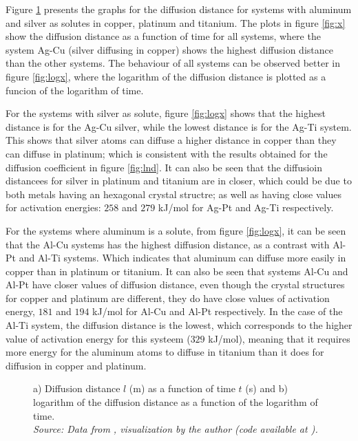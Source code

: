 Figure \ref{fig:length} presents the graphs for the diffusion distance for systems with aluminum and silver as solutes in copper, platinum and titanium. The plots in figure \ref{fig:x} show the diffusion distance as a function of time for all systems, where the system Ag-Cu (silver diffusing in copper) shows the highest diffusion distance than the other systems. The behaviour of all systems can be observed better in figure \ref{fig:logx}, where the logarithm of the diffusion distance is plotted as a funcion of the logarithm of time.

For the systems with silver as solute, figure \ref{fig:logx} shows that the highest distance is for the Ag-Cu silver, while the lowest distance is for the Ag-Ti system. This shows that silver atoms can diffuse a higher distance in copper than they can diffuse in platinum; which is consistent with the results obtained for the diffusion coefficient in figure \ref{fig:lnd}. It can also be seen that the diffusioin distancees for silver in platinum and titanium are in closer, which could be due to both metals having an hexagonal crystal structre; as well as having close values for activation energies: $258$ and $279$ kJ/mol for Ag-Pt and Ag-Ti respectively. 

For the systems where aluminum is a solute, from figure \ref{fig:logx}, it can be seen that the Al-Cu systems has the highest diffusion distance, as a contrast with Al-Pt and Al-Ti systems.  Which indicates that aluminum can diffuse more easily in copper than in platinum or titanium. It can also be seen that systems Al-Cu and Al-Pt have closer values of diffusion distance, even though the crystal structures for copper and platinum are different, they do have close values of activation energy, $181$ and $194$ kJ/mol for Al-Cu and Al-Pt respectively. In the case of the Al-Ti system, the diffusion distance is the lowest, which corresponds to the higher value of activation energy for this systeem ($329$ kJ/mol), meaning that it requires more energy for the aluminum atoms to diffuse in titanium than it does for diffusion in copper and platinum.  

\begin{figure}[h]
 \centering
 \caption{a) Diffusion distance $l$ (m) as a function of time $t$ (s) and b) logarithm of the diffusion distance as a function of the logarithm of time. \\
 \textit{Source: Data from \citep{kakusan}, visualization by the author (code available at \citep{mygit}).}}
 \label{fig:length}
\end{figure}



